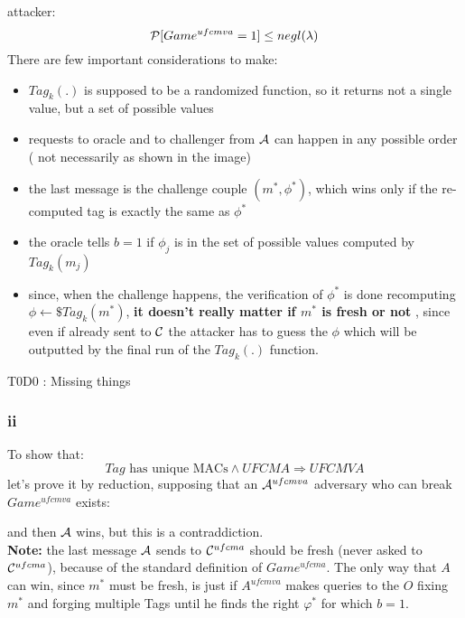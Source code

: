 \documentclass[11pt]{article}
\newcounter{t0d0_counter}
\newcommand{\todo}[1]{
  \stepcounter{t0d0_counter}
  \definecolor{shadecolor}{rgb}{1,1,0} %
  \begin{shaded}
  T0D0 \arabic{t0d0_counter}: #1
  \end{shaded}
}
\begin{document}
attacker:
\[
    \P [ Game^{ufcmva}=1 ] \leq negl(\lambda)  
\]
There are few important considerations to make:
\begin{itemize}
    \item $Tag_{k}(.)$ is supposed to be a randomized function, so it returns
        not a single value, but a set of possible values
    \item requests to oracle and to challenger from $\A$ can happen in any
        possible order ( not necessarily as shown in the image)
    \item the last message is the challenge couple $(m^{*}, \phi^{*})$, which
            wins only if the re-computed tag is exactly the same as $\phi^{*}$
    \item the oracle tells $b=1$ if $\phi_{j}$ is in the set of possible values
        computed by $Tag_{k}(m_{j})$
    \item since, when the challenge happens, the verification of $\phi^{*}$ is
        done recomputing $\phi \leftarrow\$ Tag_{k}(m^{*})$, 
        \textbf{it doesn't really matter if $m^{*}$ is fresh or not} , since even if
        already sent to $\C$ the attacker has to guess the $\phi$ which will be
        outputted by the final run of the $Tag_{k}(.)$ function.
\end{itemize}
\todo{Missing things}
\subsubsection{ ii }
To show that:
\[
   Tag \text{ has unique MACs} \wedge UFCMA \Rightarrow UFCMVA
\]
 let's prove it by reduction, supposing that an $\A^{ufcmva}$ adversary who can
 break $Game^{ufcmva}$ exists:

\begin{figure}[h!]
   \centering
   \sdinit{}
\end{figure}
and then $\A$ wins, but this is a contraddiction.\\

\textbf{Note:} the last message $\A$ sends to $\C^{ufcma}$ should be fresh
(never asked to $\C^{ufcma}$), because of the standard definition of $Game^{ufcma}$. The only way that $A$ can win, since $m^*$ must be fresh, is just if $A^{ufcmva}$ makes queries to the $O$ fixing $m^*$ and forging multiple Tags until he finds the right $\varphi^*$ for which  $b=1$.
\end{document}
